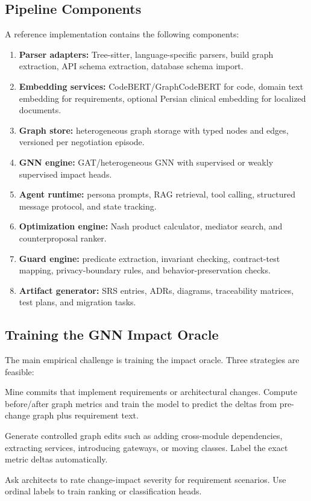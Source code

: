 \documentclass[english,preprint,nonatbib]{elsarticle}
\begin{document}
\subsection{Pipeline Components}

A reference implementation contains the following components:

\begin{enumerate}[leftmargin=2em]
  \item \textbf{Parser adapters:} Tree-sitter, language-specific parsers, build graph extraction, API schema extraction, database schema import.
  \item \textbf{Embedding services:} CodeBERT/GraphCodeBERT for code, domain text embedding for requirements, optional Persian clinical embedding for localized documents.
  \item \textbf{Graph store:} heterogeneous graph storage with typed nodes and edges, versioned per negotiation episode.
  \item \textbf{GNN engine:} GAT/heterogeneous GNN with supervised or weakly supervised impact heads.
  \item \textbf{Agent runtime:} persona prompts, RAG retrieval, tool calling, structured message protocol, and state tracking.
  \item \textbf{Optimization engine:} Nash product calculator, mediator search, and counterproposal ranker.
  \item \textbf{Guard engine:} predicate extraction, invariant checking, contract-test mapping, privacy-boundary rules, and behavior-preservation checks.
  \item \textbf{Artifact generator:} SRS entries, ADRs, diagrams, traceability matrices, test plans, and migration tasks.
\end{enumerate}

\subsection{Training the GNN Impact Oracle}

The main empirical challenge is training the impact oracle.
Three strategies are feasible:

\begin{description}[leftmargin=2.5em]
  \item[Historical supervision:] Mine commits that implement requirements or architectural changes.
Compute before/after graph metrics and train the model to predict the deltas from pre-change graph plus requirement text.
  \item[Synthetic perturbation:] Generate controlled graph edits such as adding cross-module dependencies, extracting services, introducing gateways, or moving classes.
Label the exact metric deltas automatically.
  \item[Expert weak labels:] Ask architects to rate change-impact severity for requirement scenarios.
Use ordinal labels to train ranking or classification heads.
\end{description}
\end{document}
